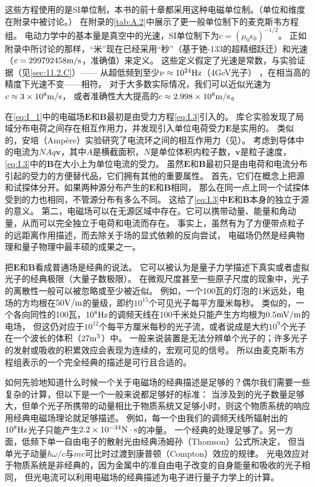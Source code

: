 \documentclass[12pt]{book}
\numberwithin{equation}{chapter}
\numberwithin{figure}{chapter}
\numberwithin{footnote}{page}
\begin{document}
这些方程使用的是SI单位制，本书的前十章都采用这种电磁单位制。（单位和维度在附录中被讨论。）
在附录的\autoref{tab:A.2}中展示了更一般单位制下的麦克斯韦方程组。
电动力学中的基本量是真空中的光速，SI单位制下为$c=(\mu_0\epsilon_0)^{-1/2}$。
正如附录中所讨论的那样，“米”现在已经采用“秒”（基于铯-133的超精细跃迁）和光速（$c=299792458{\rm m/s}$，准确值）来定义。
这些定义假定了光速是常数，与实验证据（见\autoref{sec:11.2.C}）——
从超低频到至少$\nu\approx10^{24}{\rm Hz}$（4GeV光子） ，在相当高的精度下光速不变——相符。
对于大多数实际情况，我们可以近似光速为$c\approx 3\times10^8{\rm m/s}$，
或者准确性大大提高的$c\approx 2.998\times10^{8}{\rm m/s}$。

在\autoref{eq:I_1}中的电磁场$\mathbf{E}$和$\mathbf{B}$最初是由受力方程\autoref{eq:I.3}引入的。
库仑实验发现了局域分布电荷之间存在相互作用力，并发现引入单位电荷受力$\mathbf{E}$是实用的。
类似的，安培（Ampère）实验研究了电流环之间的相互作用力（见）。
考虑到导体中的电流为$NAq\mathbf{v}$，其中$A$是横截面积，$N$是单位体积内粒子数，$\mathbf{v}$是粒子速度，
\autoref{eq:I.3}中的$\mathbf{B}$在大小上为单位电流的受力。
虽然$\mathbf{E}$和$\mathbf{B}$最初只是由电荷和电流分布引起的受力的方便替代品，它们拥有其他的重要属性。
首先，它们在概念上把源和试探体分开。如果两种源分布产生的$\mathbf{E}$和$\mathbf{B}$相同，
那么在同一点上同一个试探体受到的力也相同，不管源分布有多么不同。
这给了\autoref{eq:I.3}中$\mathbf{E}$和$\mathbf{B}$本身的独立于源的意义。
第二，电磁场可以在无源区域中存在。它可以携带动量、能量和角动量，从而可以完全独立于电荷和电流而存在。
事实上，虽然有为了方便带点粒子的远距离作用描述，而去除关于场的显式依赖的反向尝试，
电磁场仍然是经典物理和量子物理中最丰硕的成果之一。

把$\mathbf{E}$和$\mathbf{B}$看成普通场是经典的说法。
它可以被认为是量子力学描述下真实或者虚拟光子的经典极限（大量子数极限）。
在微观尺度甚至一些原子尺度的现象中，光子的离散性一般可以被忽略或至少被近似。
例如，一个100瓦的灯泡的1米远处，电场的方均根在$50{\rm V/m}$的量级，即约$10^{15}$个可见光子每平方厘米每秒。
类似的，一个各向同性的100瓦，$10^8{\rm Hz}$的调频天线在100千米处只能产生方均根为$0.5{\rm mV/m}$的电场，
但这仍对应于$10^{12}$个每平方厘米每秒的光子流，或者说成是大约$10^9$个光子在一个波长的体积（$27{\rm m^3}$）中。
一般来说装置是无法分辨单个光子的；许多光子的发射或吸收的积累效应会表现为连续的，宏观可见的信号。
所以由麦克斯韦方程组表示的一个完全经典的描述是可行且合适的。

如何先验地知道什么时候一个关于电磁场的经典描述是足够的？偶尔我们需要一些复杂的计算，但以下是一个一般来说都足够好的标准：
当涉及到的光子数量足够大，但单个光子所携带的动量相比于物质系统又足够小时，则这个物质系统的响应用经典电磁场理论就足够描述。
例如，每一个由我们的调频天线所辐射出的$10^8{\rm Hz}$光子只能产生$2.2\times10^{-34}{\rm N\cdot s}$的冲量。
一个经典的处理足够了。另一方面，低频下单一自由电子的散射光由经典汤姆孙（Thomson）公式所决定，
但当单光子动量$\hbar \omega/c$与$mc$可比时过渡到康普顿（Compton）效应的规律。
光电效应对于物质系统是非经典的，因为金属中的准自由电子改变的自身能量和吸收的光子相同，
但光电流可以利用电磁场的经典描述为电子进行量子力学上的计算。
\end{document}
